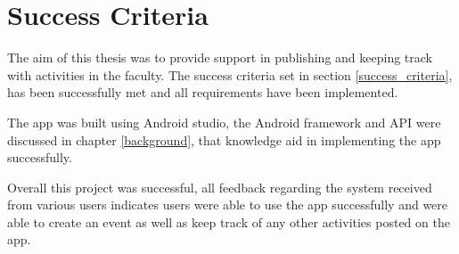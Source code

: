 \section{Success Criteria}
The aim of this thesis was to provide support in publishing and keeping track with activities in the faculty.
The success criteria set in section \ref{success_criteria}, has been successfully met and all requirements have been implemented.

The app was built using Android studio, the Android framework and API were discussed in chapter \ref{background}, that knowledge aid in implementing the app successfully. 
 
Overall this project was successful, all feedback regarding the system received from various users indicates users were able to use the app successfully and were able to create an event as well as keep track of any other activities posted on the app.